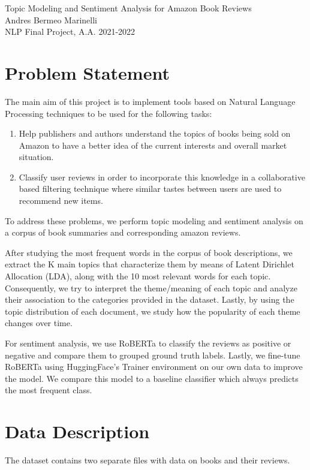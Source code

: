 \documentclass[a4paper,10pt, openright]{article}
\begin{document}
	\begin{center}
	{\Huge Topic Modeling and Sentiment Analysis for Amazon Book Reviews}\\
	{ Andres Bermeo Marinelli}\\
	{NLP Final Project, A.A. 2021-2022}
		
	\end{center}

\tableofcontents

\newpage
\section{Problem Statement }
The main aim of this project is to implement tools based on Natural Language Processing techniques to be used for the following tasks:

\begin{enumerate}
	\item Help publishers and authors understand the topics of books being sold on Amazon to have a better idea of the current interests and overall market situation.
	\item Classify user reviews in order to incorporate this knowledge in a collaborative based filtering technique where similar tastes between users are used to recommend new items.   
\end{enumerate}  

To address these problems, we perform topic modeling and sentiment analysis on a corpus of book summaries and corresponding amazon reviews.

After studying the most frequent words in the corpus of book descriptions, we extract the K main topics that characterize them by means of Latent Dirichlet Allocation (LDA), along with the 10 most relevant words for each topic. Consequently, we try to interpret the theme/meaning of each topic and analyze their association to the categories provided in the dataset. Lastly, by using the topic distribution of each document, we study how the popularity of each theme changes over time.

For sentiment analysis, we use RoBERTa to classify the reviews as positive or negative and compare them to grouped ground truth labels. Lastly, we fine-tune RoBERTa using HuggingFace's Trainer environment on our own data to improve the model. We compare this model to a baseline classifier which always predicts the most frequent class. 

\section{Data Description }
The dataset contains two separate files with data on books and their reviews. 
\end{document}
